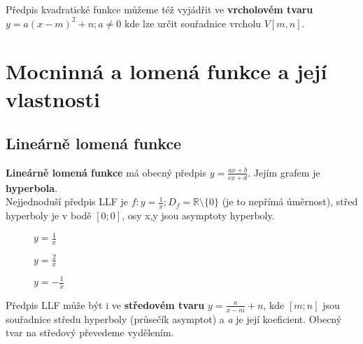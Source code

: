 \documentclass[12pt, a4paper]{article}
\begin{document}
Předpis kvadratické funkce můžeme též vyjádřit ve \textbf{vrcholovém tvaru} $y=a(x-m)^2+n; a \neq 0$ kde lze určit souřadnice vrcholu $V[m,n]$.

\section{Mocninná a lomená funkce a její vlastnosti}
\subsection*{Lineárně lomená funkce}
\textbf{Lineárně lomená funkce} má obecný předpis $y=\frac{ax+b}{cx+d}$. Jejím grafem je \textbf{hyperbola}.\\
Nejjednoduší předpis LLF je $f:y=\frac{1}{x}; D_f=\mathbb{R} \setminus \{0\}$ (je to nepřímá úměrnost), střed hyperboly je v bodě $[0;0]$, osy x,y jsou asymptoty hyperboly.\\

\begin{figure}[H]
\centering
{}
\caption{$y=\frac{1}{x}$}
\end{figure}

\begin{figure}[H]
\centering
{}
\caption{$y=\frac{2}{x}$}
\end{figure}

\begin{figure}[H]
\centering
{}
\caption{$y=-\frac{1}{x}$}
\end{figure}

Předpis LLF může být i ve \textbf{středovém tvaru} $y=\frac{a}{x-m}+n$, kde $[m;n]$ jsou souřadnice středu hyperboly (průsečík asymptot) a \textit{a} je její koeficient. Obecný tvar na středový převedeme vydělením.
\end{document}
